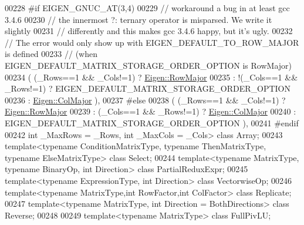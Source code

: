 \begin{DoxyCode}
00228 \textcolor{preprocessor}{#if EIGEN\_GNUC\_AT(3,4)}
00229     \textcolor{comment}{// workaround a bug in at least gcc 3.4.6}
00230     \textcolor{comment}{// the innermost ?: ternary operator is misparsed. We write it slightly}
00231     \textcolor{comment}{// differently and this makes gcc 3.4.6 happy, but it's ugly.}
00232     \textcolor{comment}{// The error would only show up with EIGEN\_DEFAULT\_TO\_ROW\_MAJOR is defined}
00233     \textcolor{comment}{// (when EIGEN\_DEFAULT\_MATRIX\_STORAGE\_ORDER\_OPTION is RowMajor)}
00234                           ( (\_Rows==1 && \_Cols!=1) ? \hyperlink{group__enums_ggaacded1a18ae58b0f554751f6cdf9eb13acfcde9cd8677c5f7caf6bd603666aae3}{Eigen::RowMajor}
00235                           : !(\_Cols==1 && \_Rows!=1) ?  EIGEN\_DEFAULT\_MATRIX\_STORAGE\_ORDER\_OPTION
00236                           : \hyperlink{group__enums_ggaacded1a18ae58b0f554751f6cdf9eb13a0cbd4bdd0abcfc0224c5fcb5e4f6669a}{Eigen::ColMajor} ),
00237 #\textcolor{keywordflow}{else}
00238                           ( (\_Rows==1 && \_Cols!=1) ? \hyperlink{group__enums_ggaacded1a18ae58b0f554751f6cdf9eb13acfcde9cd8677c5f7caf6bd603666aae3}{Eigen::RowMajor}
00239                           : (\_Cols==1 && \_Rows!=1) ? \hyperlink{group__enums_ggaacded1a18ae58b0f554751f6cdf9eb13a0cbd4bdd0abcfc0224c5fcb5e4f6669a}{Eigen::ColMajor}
00240                           : EIGEN\_DEFAULT\_MATRIX\_STORAGE\_ORDER\_OPTION ),
00241 \textcolor{preprocessor}{#endif}
00242          \textcolor{keywordtype}{int} \_MaxRows = \_Rows, \textcolor{keywordtype}{int} \_MaxCols = \_Cols> \textcolor{keyword}{class }Array;
00243 \textcolor{keyword}{template}<\textcolor{keyword}{typename} ConditionMatrixType, \textcolor{keyword}{typename} ThenMatrixType, \textcolor{keyword}{typename} ElseMatrixType> \textcolor{keyword}{class }Select;
00244 \textcolor{keyword}{template}<\textcolor{keyword}{typename} MatrixType, \textcolor{keyword}{typename} BinaryOp, \textcolor{keywordtype}{int} Direction> \textcolor{keyword}{class }PartialReduxExpr;
00245 \textcolor{keyword}{template}<\textcolor{keyword}{typename} ExpressionType, \textcolor{keywordtype}{int} Direction> \textcolor{keyword}{class }VectorwiseOp;
00246 \textcolor{keyword}{template}<\textcolor{keyword}{typename} MatrixType,\textcolor{keywordtype}{int} RowFactor,\textcolor{keywordtype}{int} ColFactor> \textcolor{keyword}{class }Replicate;
00247 \textcolor{keyword}{template}<\textcolor{keyword}{typename} MatrixType, \textcolor{keywordtype}{int} Direction = BothDirections> \textcolor{keyword}{class }Reverse;
00248 
00249 \textcolor{keyword}{template}<\textcolor{keyword}{typename} MatrixType> \textcolor{keyword}{class }FullPivLU;

\end{DoxyCode}
